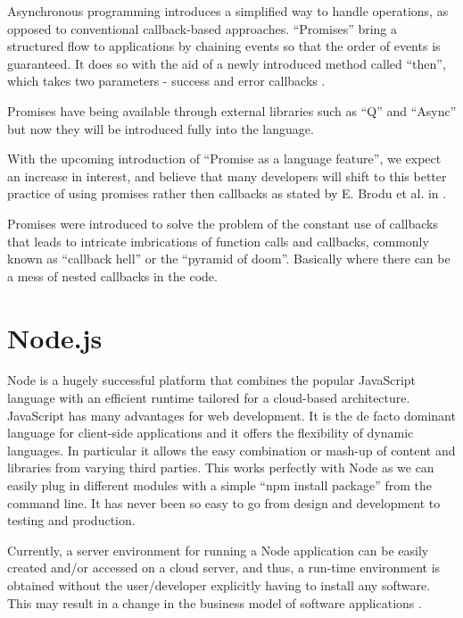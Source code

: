 \documentclass[12pt]{article} %
\begin{document}
Asynchronous programming introduces a simplified way to handle operations, as opposed to conventional callback-based approaches. ``Promises'' bring a structured flow to applications by chaining events so that the order of events is guaranteed. It does so with the aid of a newly introduced method called ``then'', which takes two parameters - success and error callbacks \cite{2}.

Promises have being available through external libraries such as ``Q'' and ``Async'' but now they will be introduced fully into the language.

With the upcoming introduction of ``Promise as a language feature'', we expect an increase in interest, and believe that many developers will shift to this better practice of using promises rather then callbacks as stated by E. Brodu et al. in \cite{7}.

Promises were introduced to solve the problem of the constant use of callbacks that leads to intricate imbrications of function calls and callbacks, commonly known as ``callback hell'' or the ``pyramid of doom''. Basically where there can be a mess of nested callbacks in the code.


\section{Node.js} %

Node is a hugely successful platform that combines the popular JavaScript language with an efficient runtime tailored for a cloud-based architecture. 
JavaScript has many advantages for web development. It is the de facto dominant language for client-side applications and it offers the flexibility of dynamic languages. In particular it allows the easy combination or mash-up of content and libraries from varying third parties\cite{12}. This works perfectly with Node as we can easily plug in different modules with a simple ``npm install \textlangle{}package\textrangle{}'' from the command line.
It has never been so easy to go from design and development to testing and production.

Currently, a server environment for running a Node application can be easily created and/or accessed on a cloud server, and thus, a run-time environment is obtained without the user/developer explicitly having to install any software. This may result in a change in the business model of software applications \cite{13}.
\end{document}
